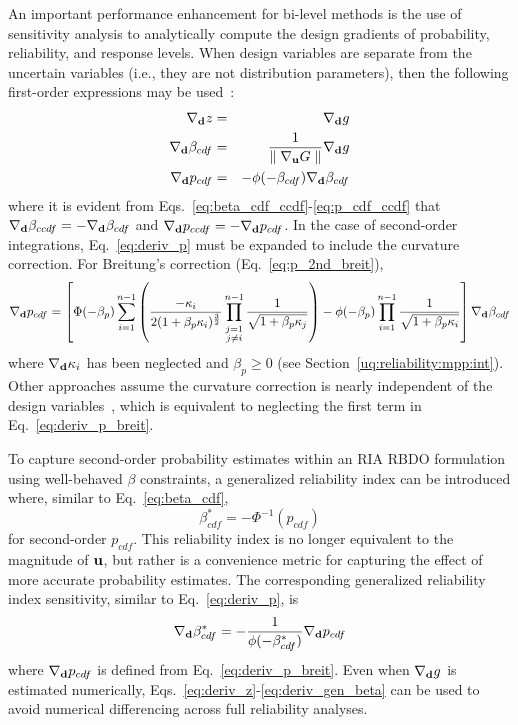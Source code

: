 An important performance enhancement for bi-level methods is the use
of sensitivity analysis to analytically compute the design gradients
of probability, reliability, and response levels.  When design
variables are separate from the uncertain variables (i.e., they are
not distribution parameters), then the following first-order 
expressions may be used~\cite{Hoh86,Kar92,All04}:
\begin{eqnarray}
\nabla_{\bf d} z           & = & \nabla_{\bf d} g \label{eq:deriv_z} \\
\nabla_{\bf d} \beta_{cdf} & = & \frac{1}{{\parallel \nabla_{\bf u} G 
\parallel}} \nabla_{\bf d} g \label{eq:deriv_beta} \\
\nabla_{\bf d} p_{cdf}     & = & -\phi(-\beta_{cdf}) \nabla_{\bf d} \beta_{cdf}
\label{eq:deriv_p}
\end{eqnarray}
where it is evident from Eqs.~\ref{eq:beta_cdf_ccdf}-\ref{eq:p_cdf_ccdf} 
that $\nabla_{\bf d} \beta_{ccdf} = -\nabla_{\bf d} \beta_{cdf}$ and 
$\nabla_{\bf d} p_{ccdf} = -\nabla_{\bf d} p_{cdf}$.  In the case of 
second-order integrations, Eq.~\ref{eq:deriv_p} must be expanded to 
include the curvature correction.  For Breitung's correction 
(Eq.~\ref{eq:p_2nd_breit}),
\begin{equation}
\nabla_{\bf d} p_{cdf} = \left[ \Phi(-\beta_p) \sum_{i=1}^{n-1} 
\left( \frac{-\kappa_i}{2 (1 + \beta_p \kappa_i)^{\frac{3}{2}}}
\prod_{\stackrel{\scriptstyle j=1}{j \ne i}}^{n-1} 
\frac{1}{\sqrt{1 + \beta_p \kappa_j}} \right) - 
\phi(-\beta_p) \prod_{i=1}^{n-1} \frac{1}{\sqrt{1 + \beta_p \kappa_i}} 
\right] \nabla_{\bf d} \beta_{cdf} \label{eq:deriv_p_breit}
\end{equation}
where $\nabla_{\bf d} \kappa_i$ has been neglected and $\beta_p \ge 0$
(see Section~\ref{uq:reliability:mpp:int}).  Other approaches assume
the curvature correction is nearly independent of the design
variables~\cite{Rac02}, which is equivalent to neglecting the first
term in Eq.~\ref{eq:deriv_p_breit}.

To capture second-order probability estimates within an RIA RBDO
formulation using well-behaved $\beta$ constraints, a generalized 
reliability index can be introduced where, similar to Eq.~\ref{eq:beta_cdf},
\begin{equation}
\beta^*_{cdf} = -\Phi^{-1}(p_{cdf}) \label{eq:gen_beta}
\end{equation}
for second-order $p_{cdf}$.  This reliability index is no longer
equivalent to the magnitude of ${\bf u}$, but rather is a convenience
metric for capturing the effect of more accurate probability
estimates.  The corresponding generalized reliability index
sensitivity, similar to Eq.~\ref{eq:deriv_p}, is
\begin{equation}
\nabla_{\bf d} \beta^*_{cdf} = -\frac{1}{\phi(-\beta^*_{cdf})}
\nabla_{\bf d} p_{cdf} \label{eq:deriv_gen_beta}
\end{equation}
where $\nabla_{\bf d} p_{cdf}$ is defined from Eq.~\ref{eq:deriv_p_breit}.
Even when $\nabla_{\bf d} g$ is estimated numerically,
Eqs.~\ref{eq:deriv_z}-\ref{eq:deriv_gen_beta} can be used to avoid
numerical differencing across full reliability analyses.


